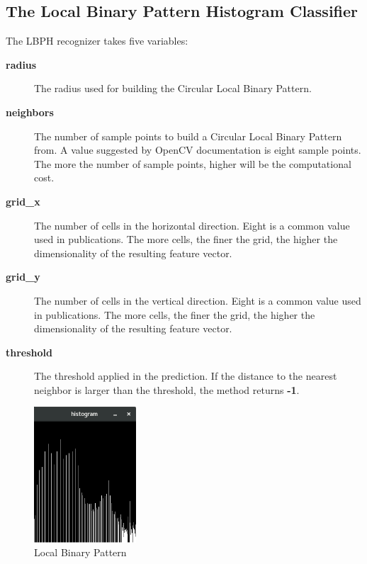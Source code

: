 \subsection{The Local Binary Pattern Histogram Classifier}
The LBPH recognizer takes five variables: \\
\begin{description}
  \item[\textbf{radius}] \quad
  The radius used for building the Circular Local Binary Pattern.

  \item[\textbf{neighbors}] \quad
  The number of sample points to build a Circular Local Binary Pattern from.
  A value suggested by OpenCV documentation is eight sample points.
  The more the number of sample points, higher will be the computational cost.

  \item[\textbf{grid\_x}] \quad
  The number of cells in the horizontal direction.
  Eight is a common value used in publications.
  The more cells, the finer the grid, the higher the dimensionality of the
  resulting feature vector.

  \item[\textbf{grid\_y}] \quad
  The number of cells in the vertical direction.
  Eight is a common value used in publications.
  The more cells, the finer the grid, the higher the dimensionality of the
  resulting feature vector.

  \item[\textbf{threshold}] \quad
  The threshold applied in the prediction.
  If the distance to the nearest neighbor is larger than the threshold,
  the method returns \textbf{-1}.
\end{description}

\begin{figure}[!t]
\centering
\includegraphics[width=1.5in]{./histogram.png}
\caption{Local Binary Pattern}
\label{fig:lbph}
\end{figure}


